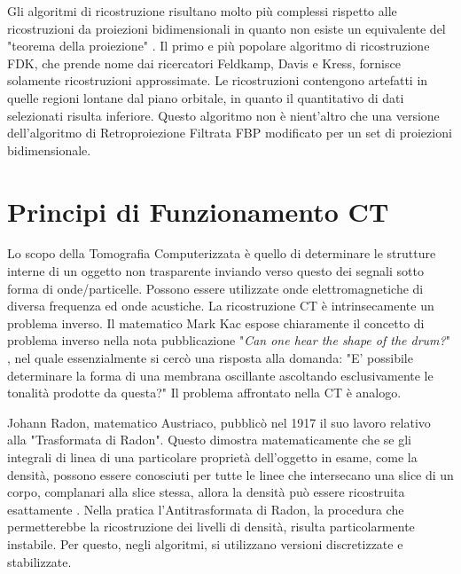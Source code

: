 \documentclass[a4paper,12pt, doubleside]{report}
\begin{document}
                \par
                    Gli algoritmi di ricostruzione risultano molto più complessi rispetto alle ricostruzioni da proiezioni bidimensionali in quanto non esiste un equivalente del "teorema della proiezione" \cite{zeng}.
                    Il primo e più popolare algoritmo di ricostruzione FDK, che prende nome dai ricercatori Feldkamp, Davis e Kress, fornisce solamente ricostruzioni approssimate. Le ricostruzioni contengono artefatti in quelle regioni lontane dal piano orbitale, in quanto il quantitativo di dati selezionati risulta inferiore.
                    Questo algoritmo non è nient'altro che una versione dell'algoritmo di Retroproiezione Filtrata FBP modificato per un set di proiezioni bidimensionale.   
                                            
        \section{Principi di Funzionamento CT}
            \par
                Lo scopo della Tomografia Computerizzata è quello di determinare le strutture interne di un oggetto non trasparente inviando verso questo dei segnali sotto forma di onde/particelle. Possono essere utilizzate onde elettromagnetiche di diversa frequenza ed onde acustiche. La ricostruzione CT è intrinsecamente un problema inverso.
                Il matematico Mark Kac espose chiaramente il concetto di problema inverso nella nota pubblicazione "\textit{Can one hear the shape of the drum?}" \cite{mark-kac}, nel quale essenzialmente si cercò una risposta alla domanda: "E' possibile determinare la forma di una membrana oscillante ascoltando esclusivamente le tonalità prodotte da questa?" Il problema affrontato nella CT è analogo.
            
            \bigskip
            \par
                Johann Radon, matematico Austriaco, pubblicò nel 1917 il suo lavoro relativo alla "Trasformata di Radon". Questo dimostra matematicamente che se gli integrali di linea di una particolare proprietà dell'oggetto in esame, come la densità, possono essere conosciuti per tutte le linee che intersecano una slice di un corpo, complanari alla slice stessa, allora la densità può essere ricostruita esattamente \cite{history-radiology}. Nella pratica l'Antitrasformata di Radon, la procedura che permetterebbe la ricostruzione dei livelli di densità, risulta particolarmente instabile. Per questo, negli algoritmi, si utilizzano versioni discretizzate e stabilizzate.
                
\end{document}
